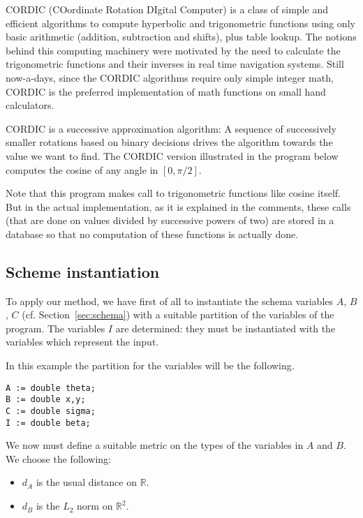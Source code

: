 \documentclass[copyright,creativecommons]{eptcs}
\newcommand{\R}{\mathbb{R}}
\begin{document}
CORDIC (COordinate Rotation DIgital Computer) is a class of simple and
efficient algorithms to compute  hyperbolic and trigonometric
functions using only basic arithmetic (addition, subtraction and
shifts), plus table lookup. The notions behind this computing
machinery were motivated by the need to calculate the trigonometric
functions and their inverses in real time navigation systems. Still
now-a-days, since the CORDIC algorithms  require  only  simple integer
math, CORDIC is the preferred implementation of math functions on
small  hand calculators.

CORDIC is a successive approximation algorithm:  A sequence of
successively smaller rotations based on binary decisions drives the
algorithm towards 
the value we want to find.  The CORDIC version illustrated in the
program below  computes the cosine of any angle in $[0,\pi/2]$.  

{}
Note that this program makes call to trigonometric functions like
cosine itself. But in the actual implementation, as it is explained in
the comments, these calls (that are done on values divided by successive powers of two) are
stored in a database so that no computation of these functions is actually done.

\subsection{Scheme instantiation}
To apply our method, we have first of all to instantiate the schema variables  $A$, $B$, $C$  (cf. Section~\ref{sec:schema}) with a suitable partition of the variables of the program.
The variables $I$ are determined: they must be instantiated  with the variables which represent the  
input. 

In this example the partition for the variables will be the
following.

{\begin{lstlisting}
A := double theta;
B := double x,y;
C := double sigma;
I := double beta;
\end{lstlisting}}

We now must define a suitable metric on the types of the  variables in $A$ and $B$. We choose the  following:
\begin{itemize}
\item $d_A$ is the usual distance on $\R$.
\item $d_B$ is the $L_2$ norm on $\R^2$.
\end{itemize}
\end{document}

